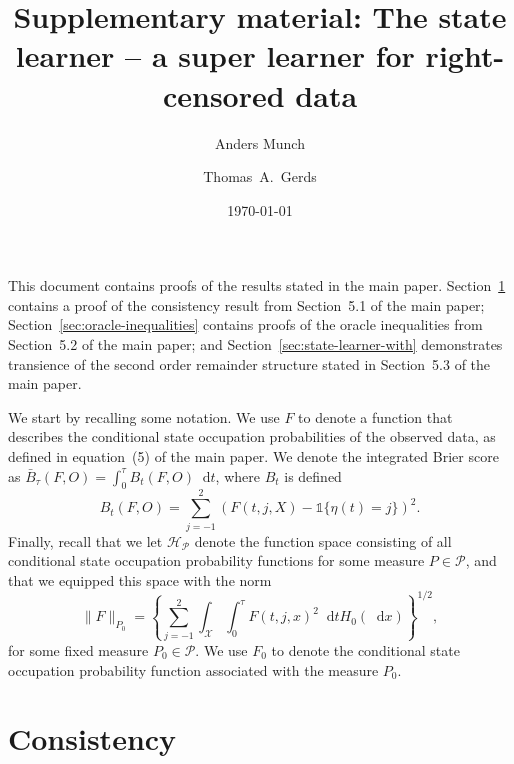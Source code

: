 \documentclass[11pt]{article}
\title{\Large Supplementary material: The state learner -- a super learner for right-censored data}
\date{\small \today}
\author[1,*]{\normalsize Anders Munch}
\author[1]{\normalsize Thomas~A.~Gerds}
\affil[1]{\normalsize Section of Biostatistics, University of Copenhagen}
\affil[*]{\normalsize Address for correspondence: \href{email:email-id.com}{a.munch@sund.ku.dk}}
\theoremstyle{thmstyleone}%
\theoremstyle{thmstyletwo}%
\theoremstyle{thmstylethree}%
\newcommand*\diff{\mathop{}\!\mathrm{d}}
\newcommand{\1}{\mathds{1}}
\begin{document}
\maketitle

This document contains proofs of the results stated in the main paper.
Section~\ref{sec:consistency} contains a proof of the consistency result from
Section~5.1 of the main paper; Section~\ref{sec:oracle-inequalities} contains
proofs of the oracle inequalities from Section~5.2 of the main paper; and
Section~\ref{sec:state-learner-with} demonstrates transience of the second order
remainder structure stated in Section~5.3 of the main paper.

We start by recalling some notation. We use \( F \) to denote a function that
describes the conditional state occupation probabilities of the observed data,
as defined in equation~(5) of the main paper. We denote the integrated Brier
score as \( \bar B_\tau( F,O) = \int_0^{\tau} B_t(F,O) \diff t \), where
\( B_t \) is defined
\begin{equation*}
  B_t(F,O) = \sum_{j=-1}^{2}
  \left(
      F(t,j,X) - \1{\{\eta(t)=j\}}
  \right)^2.
\end{equation*}
Finally, recall that we let $\mathcal{H}_{\mathcal{P}}$ denote the function
space consisting of all conditional state occupation probability functions for
some measure \( P \in \mathcal{P} \), and that we equipped this space with the
norm
\begin{equation}
  \label{eq:norm}
  \| F \|_{P_0} = 
  \left\{
    \sum_{j=-1}^{2}\int_{\mathcal{X}} \int_0^{\tau} F(t, j, x)^2 \diff t H_0( \diff x)
  \right\}^{1/2},
\end{equation}
for some fixed measure \( P_0 \in \mathcal{P} \). We use \( F_0 \) to denote the
conditional state occupation probability function associated with the measure
\( P_0 \).


\section{Consistency}
\label{sec:consistency}
\end{document}
